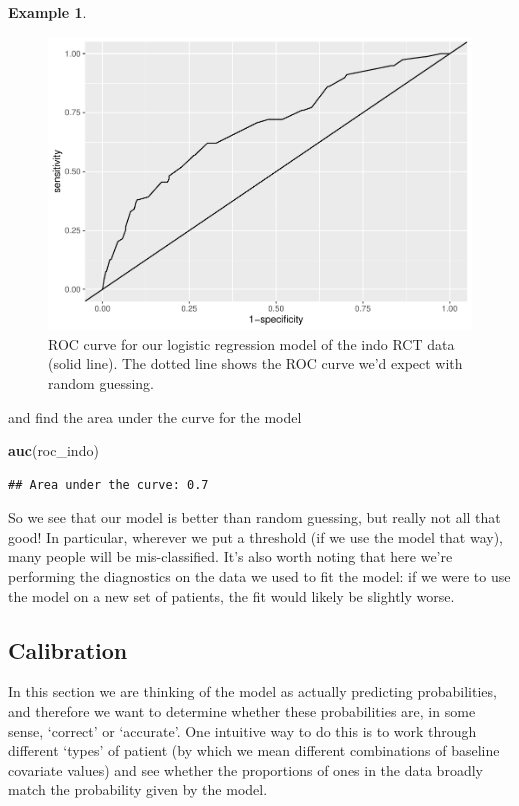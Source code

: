 \documentclass[
  openany]{book}
\newenvironment{Shaded}{\begin{snugshade}}{\end{snugshade}}
\newcommand{\FunctionTok}[1]{\textcolor[rgb]{0.13,0.29,0.53}{\textbf{#1}}}
\newcommand{\NormalTok}[1]{#1}
\theoremstyle{definition}
\theoremstyle{definition}
\newtheorem{example}{Example}[chapter]
\theoremstyle{definition}
\theoremstyle{definition}
\theoremstyle{remark}
\begin{document}
\begin{example}
\begin{figure}
\centering
\includegraphics{CT4H_notes_files/figure-latex/indoroc1-1.pdf}
\caption{\label{fig:indoroc1}ROC curve for our logistic regression model of the indo RCT data (solid line). The dotted line shows the ROC curve we'd expect with random guessing.}
\end{figure}

and find the area under the curve for the model

\begin{Shaded}
\begin{Highlighting}[]
\FunctionTok{auc}\NormalTok{(roc\_indo)}
\end{Highlighting}
\end{Shaded}

\begin{verbatim}
## Area under the curve: 0.7
\end{verbatim}

So we see that our model is better than random guessing, but really not all that good! In particular, wherever we put a threshold (if we use the model that way), many people will be mis-classified. It's also worth noting that here we're performing the diagnostics on the data we used to fit the model: if we were to use the model on a new set of patients, the fit would likely be slightly worse.
\end{example}

\subsection{Calibration}\label{calibration}

In this section we are thinking of the model as actually predicting probabilities, and therefore we want to determine whether these probabilities are, in some sense, `correct' or `accurate'. One intuitive way to do this is to work through different `types' of patient (by which we mean different combinations of baseline covariate values) and see whether the proportions of ones in the data broadly match the probability given by the model.
\end{document}
